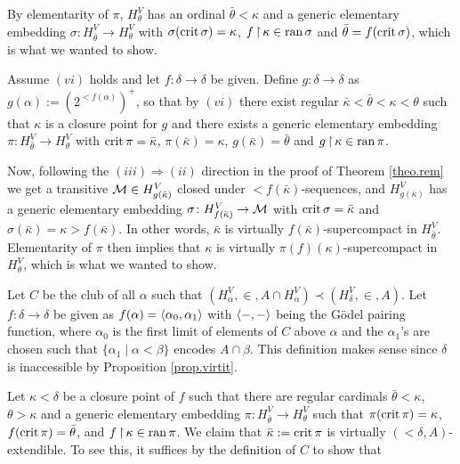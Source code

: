 \documentclass[../main]{subfiles}
\begin{document}
{  \qquad By elementarity of $\pi$, $H_\theta^V$ has an ordinal $\bar\theta<\kappa$ and a generic elementary embedding $\sigma\colon H_{\bar\theta}^V\to H_\theta^V$ with $\sigma(\operatorname{crit}\sigma)=\kappa$, $f\operatorname{\upharpoonright}\kappa\in\operatorname{ran}\sigma$ and $\bar\theta = f(\operatorname{crit}\sigma)$, which is what we wanted to show.

  \qquad {} Assume $(vi)$ holds and let $f\colon\delta\to\delta$ be given. Define $g\colon\delta\to\delta$ as $g(\alpha):=(2^{<f(\alpha)})^+$, so that by $(vi)$ there exist regular $\bar\kappa<\bar\theta<\kappa<\theta$ such that $\kappa$ is a closure point for $g$ and there exists a generic elementary embedding $\pi\colon H_{\bar\theta}^V\to H_\theta^V$ with $\operatorname{crit}\pi = \bar\kappa$, $\pi(\bar\kappa)=\kappa$, $g(\bar\kappa)=\bar\theta$ and $g\operatorname{\upharpoonright}\kappa\in\operatorname{ran}\pi$.

  \qquad Now, following the $(iii)\Rightarrow(ii)$ direction in the proof of Theorem \ref{theo.rem} we get a transitive $\operatorname{\mathcal M}\in H_{g(\bar\kappa)}^V$ closed under ${<}f(\bar\kappa)$-sequences, and $H_{g(\bar\kappa)}^V$ has a generic elementary embedding $\sigma\colon H_{f(\bar\kappa)}^V\to\operatorname{\mathcal M}$ with $\operatorname{crit}\sigma=\bar\kappa$ and $\sigma(\bar\kappa)=\kappa> f(\bar\kappa)$. In other words, $\bar\kappa$ is virtually $f(\bar\kappa)$-supercompact in $H_{\bar\theta}^V$. Elementarity of $\pi$ then implies that $\kappa$ is virtually $\pi(f)(\kappa)$-supercompact in $H_\theta^V$, which is what we wanted to show.

  \qquad {} Let $C$ be the club of all $\alpha$ such that $(H_\alpha^V,\in, A\cap H_\alpha^V)\prec(H_\delta^V,\in,A)$. Let $f\colon\delta\to\delta$ be given as $f(\alpha)=\langle \alpha_0,\alpha_1\rangle$ with $\langle -,-\rangle$ being the G\"odel pairing function, where $\alpha_0$ is the first limit of elements of $C$ above $\alpha$ and the $\alpha_1$'s are chosen such that $\{\alpha_1\mid\alpha<\beta\}$ encodes $A\cap\beta$. This definition makes sense since $\delta$ is inaccessible by Proposition \ref{prop.virtit}.

  \qquad Let $\kappa<\delta$ be a closure point of $f$ such that there are regular cardinals $\bar\theta<\kappa$, $\theta>\kappa$ and a generic elementary embedding $\pi\colon H_{\bar\theta}^V\to H_\theta^V$ such that $\pi(\operatorname{crit}\pi)=\kappa$, $f(\operatorname{crit}\pi)=\bar\theta$, and $f\operatorname{\upharpoonright}\kappa\in\operatorname{ran}\pi$. We claim that $\bar\kappa:=\operatorname{crit}\pi$ is virtually $({<}\delta, A)$-extendible. To see this, it suffices by the definition of $C$ to show that

}
\end{document}

